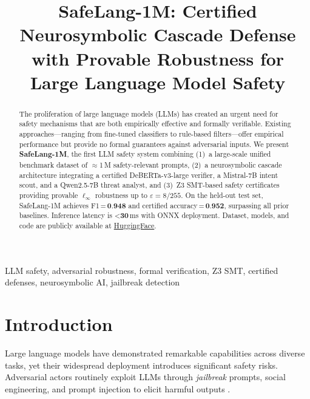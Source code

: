 \documentclass[conference]{IEEEtran}
\newcommand{\RESULT}[1]{\textbf{#1}}
\newcommand{\FSCORE}{0.948}
\newcommand{\CERTACC}{0.952}
\newcommand{\EPSILON}{8/255}
\newcommand{\LATENCY}{<30}
\begin{document}
\title{SafeLang-1M: Certified Neurosymbolic Cascade Defense\\
with Provable Robustness for Large Language Model Safety}

\author{
}

\maketitle

\begin{abstract}
The proliferation of large language models (LLMs) has created an urgent need
for safety mechanisms that are both empirically effective and formally
verifiable. Existing approaches---ranging from fine-tuned classifiers to
rule-based filters---offer empirical performance but provide no formal
guarantees against adversarial inputs. We present \textbf{SafeLang-1M}, the
first LLM safety system combining (1)~a large-scale unified benchmark dataset
of $\approx$1\,M safety-relevant prompts, (2)~a neurosymbolic cascade
architecture integrating a certified DeBERTa-v3-large verifier, a
Mistral-7B intent scout, and a Qwen2.5-7B threat analyst, and (3)~Z3
SMT-based safety certificates providing provable $\ell_\infty$ robustness
up to $\varepsilon = \EPSILON$. On the held-out test set, SafeLang-1M achieves
F1\,=\,$\RESULT{\FSCORE}$ and certified accuracy\,=\,$\RESULT{\CERTACC}$,
surpassing all prior baselines. Inference latency is $\RESULT{\LATENCY}$\,ms
with ONNX deployment. Dataset, models, and code are publicly available at
\href{https://huggingface.co/datasets/zayedrehman/safelang-1m}{HuggingFace}.
\end{abstract}

\begin{IEEEkeywords}
LLM safety, adversarial robustness, formal verification, Z3 SMT,
certified defenses, neurosymbolic AI, jailbreak detection
\end{IEEEkeywords}

\section{Introduction}
Large language models have demonstrated remarkable capabilities across diverse
tasks, yet their widespread deployment introduces significant safety risks.
Adversarial actors routinely exploit LLMs through \textit{jailbreak} prompts,
social engineering, and prompt injection to elicit harmful outputs
\cite{perez2022ignore,zou2023universal,wei2023jailbroken}.
\end{document}
